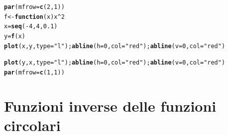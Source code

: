 \documentclass[onecolumn,11pt]{book}\usepackage[]{graphicx}\usepackage[]{color}
\makeatletter
\newcommand{\hlnum}[1]{\textcolor[rgb]{0.686,0.059,0.569}{#1}}%
\newcommand{\hlstr}[1]{\textcolor[rgb]{0.192,0.494,0.8}{#1}}%
\newcommand{\hlopt}[1]{\textcolor[rgb]{0,0,0}{#1}}%
\newcommand{\hlstd}[1]{\textcolor[rgb]{0.345,0.345,0.345}{#1}}%
\newcommand{\hlkwa}[1]{\textcolor[rgb]{0.161,0.373,0.58}{\textbf{#1}}}%
\newcommand{\hlkwb}[1]{\textcolor[rgb]{0.69,0.353,0.396}{#1}}%
\newcommand{\hlkwc}[1]{\textcolor[rgb]{0.333,0.667,0.333}{#1}}%
\newcommand{\hlkwd}[1]{\textcolor[rgb]{0.737,0.353,0.396}{\textbf{#1}}}%
\newenvironment{kframe}{%
 \def\at@end@of@kframe{}%
 \ifinner\ifhmode%
  \def\at@end@of@kframe{\end{minipage}}%
  \begin{minipage}{\columnwidth}%
 \fi\fi%
 \def\FrameCommand##1{\hskip\@totalleftmargin \hskip-\fboxsep
 \colorbox{shadecolor}{##1}\hskip-\fboxsep
     \hskip-\linewidth \hskip-\@totalleftmargin \hskip\columnwidth}%
 \MakeFramed {\advance\hsize-\width
   \@totalleftmargin\z@ \linewidth\hsize
   \@setminipage}}%
 {\par\unskip\endMakeFramed%
 \at@end@of@kframe}
\newenvironment{knitrout}{}{} %
\makeatother
\begin{document}
\begin{knitrout}
\color{fgcolor}\begin{kframe}
\begin{alltt}
\hlkwd{par}\hlstd{(}\hlkwc{mfrow}\hlstd{=}\hlkwd{c}\hlstd{(}\hlnum{2}\hlstd{,}\hlnum{1}\hlstd{))}
\hlstd{f}\hlkwb{<-}\hlkwa{function}\hlstd{(}\hlkwc{x}\hlstd{) x}\hlopt{^}\hlnum{2}
\hlstd{x}\hlkwb{=}\hlkwd{seq}\hlstd{(}\hlopt{-}\hlnum{4}\hlstd{,}\hlnum{4}\hlstd{,}\hlnum{0.1}\hlstd{)}
\hlstd{y}\hlkwb{=}\hlkwd{f}\hlstd{(x)}
\hlkwd{plot}\hlstd{(x,y,}\hlkwc{type}\hlstd{=}\hlstr{"l"}\hlstd{);}\hlkwd{abline}\hlstd{(}\hlkwc{h}\hlstd{=}\hlnum{0}\hlstd{,}\hlkwc{col}\hlstd{=}\hlstr{"red"}\hlstd{);}\hlkwd{abline}\hlstd{(}\hlkwc{v}\hlstd{=}\hlnum{0}\hlstd{,}\hlkwc{col}\hlstd{=}\hlstr{"red"}\hlstd{)}

\hlkwd{plot}\hlstd{(y,x,}\hlkwc{type}\hlstd{=}\hlstr{"l"}\hlstd{);}\hlkwd{abline}\hlstd{(}\hlkwc{h}\hlstd{=}\hlnum{0}\hlstd{,}\hlkwc{col}\hlstd{=}\hlstr{"red"}\hlstd{);}\hlkwd{abline}\hlstd{(}\hlkwc{v}\hlstd{=}\hlnum{0}\hlstd{,}\hlkwc{col}\hlstd{=}\hlstr{"red"}\hlstd{)}
\hlkwd{par}\hlstd{(}\hlkwc{mfrow}\hlstd{=}\hlkwd{c}\hlstd{(}\hlnum{1}\hlstd{,}\hlnum{1}\hlstd{))}
\end{alltt}
\end{kframe}
\end{knitrout}
\section{Funzioni inverse delle funzioni circolari}
\end{document}
